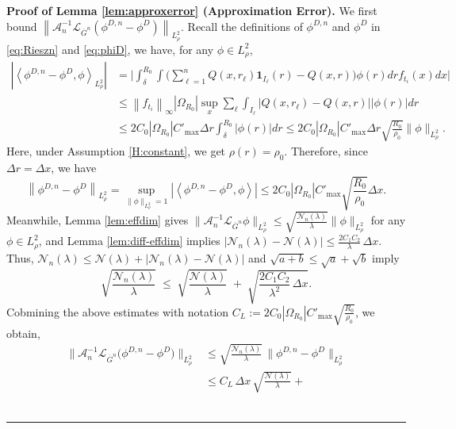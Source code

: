 \documentclass[12pt]{article}
\def\Gbar{ {\overline{G}} }
\newenvironment{proof}[1][Proof]{\noindent\textbf{#1.} }{\ \rule{0.5em}{0.5em}}
\numberwithin{equation}{section}
\numberwithin{theorem}{section}
\begin{document}
\begin{proof}[Proof of Lemma \ref{lem:approxerror} (Approximation Error)]
We first bound $\left\|\mathcal{A}_n^{-1} \mathcal{L}_{\Gbar^n}\left(\phi^{D,n}- \phi^D\right)\right\|_{L_\rho^2}$. 
Recall the definitions of $\phi^{D,n}$ and $\phi^D$ in \eqref{eq:Rieszn} and \eqref{eq:phiD}, we have,  for any $\phi \in L_\rho^2$,
$$
\begin{aligned}
\left|\left\langle\phi^{D, n}-\phi^D, \phi\right\rangle_{L^2_{\rho}}\right| 
& = 
\bigg | \int_\delta^{R_0} \int \big(\sum_{\ell=1}^n Q(x,r_{\ell})\mathbf{1}_{I_{\ell}}(r) -Q(x,r)\big) \phi(r) d r f_{t_i}(x) d x \bigg|   \\
& \leq\left\|f_{t_i}\right\|_{\infty}\left|\Omega_{R_0}\right| \sup _x \sum_{\ell} \int_{I_{\ell}}\left|Q\left(x, r_{\ell}\right)-Q(x, r)\right||\phi(r)| d r \\
& \leq 2C_0\left|\Omega_{R_0}\right| C'_{\max} \Delta r \int_{\delta}^{R_0}|\phi(r)| d r \leq 2C_0\left|\Omega_{R_0}\right| C'_{\max} \Delta r \sqrt{\frac{R_0}{\rho_{0 }}}\|\phi\|_{L^2_{\rho}}.
\end{aligned}
$$
Here, under Assumption \ref{H:constant}, we get $\rho(r) = \rho_0$. Therefore, since $\Delta r= \Delta x$, we have
$$
\left\|\phi^{D, n}-\phi^D\right\|_{L^2_{\rho}}=\sup _{\|\phi\|_{L^2_{\rho}}=1}\left|\left\langle\phi^{D, n}-\phi^D, \phi\right\rangle\right| \leq 2 C_0\left|\Omega_{R_0}\right| C'_{\max} \sqrt{\frac{R_0}{\rho_{0 }}} \Delta x.
$$
Meanwhile, Lemma \ref{lem:effdim} gives $\|\mathcal{A}_n^{-1} \mathcal{L}_{\Gbar^n} \phi\|_{L^2_\rho}\leq \sqrt{\frac{\mathcal{N}_n(\lambda)}{\lambda}} \|\phi\|_{L^2_\rho}$ for any $\phi\in L^2_\rho$, and Lemma \ref{lem:diff-effdim} implies $|\mathcal{N}_n(\lambda)-\mathcal{N}(\lambda)| \leq \frac{2C_1C_2}{\lambda}\,\Delta x $. Thus, $\mathcal{N}_n(\lambda)
\le \mathcal{N}(\lambda) + |\mathcal{N}_n(\lambda)-\mathcal{N}(\lambda)| $ and $\sqrt{a+b}\le \sqrt{a}+\sqrt{b}$ imply    
\begin{equation}
\label{eq:Nnlambda}
\sqrt{\frac{\mathcal{N}_n(\lambda)}{\lambda}}
\;\le\;
\sqrt{\frac{\mathcal{N}(\lambda)}{\lambda}}
\;+\;
\sqrt{\frac{2C_1C_2}{\lambda^2}\,\Delta x}.
\end{equation}
Cobmining the above estimates with notation $C_L := 2 C_0\left|\Omega_{R_0}\right| C'_{\max} \sqrt{\frac{R_0}{\rho_{0}}}$, we obtain, 
$$
\begin{aligned}
\bigl\|\mathcal{A}_n^{-1} \mathcal{L}_{\Gbar^n}\bigl(\phi^{D,n}- \phi^D\bigr)\bigr\|_{L_\rho^2}
&\leq \sqrt{\frac{\mathcal{N}_n(\lambda)}{\lambda}}\,
      \bigl\|\phi^{D,n}- \phi^D\bigr\|_{L^2_{\rho}}\\
&\leq C_L\,\Delta x\,\sqrt{\frac{\mathcal{N}(\lambda)}{\lambda}} +

\end{aligned}$$
\end{proof}
\end{document}
